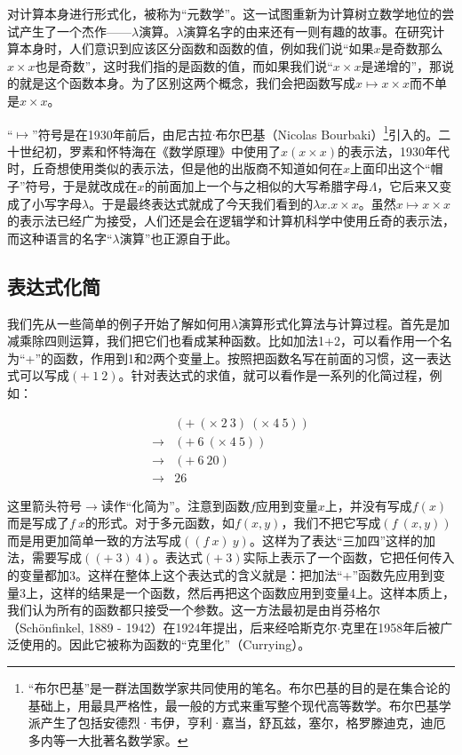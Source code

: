\documentclass{article}
\begin{document}
对计算本身进行形式化，被称为“元数学”。这一试图重新为计算树立数学地位的尝试产生了一个杰作——$\lambda$演算。$\lambda$演算名字的由来还有一则有趣的故事。在研究计算本身时，人们意识到应该区分函数和函数的值，例如我们说“如果$x$是奇数那么$x \times x$也是奇数”，这时我们指的是函数的值，而如果我们说“$x \times x$是递增的”，那说的就是这个函数本身。为了区别这两个概念，我们会把函数写成$x \mapsto x \times x$而不单是$x \times x$。

“$\mapsto$”符号是在1930年前后，由尼古拉$\cdot$布尔巴基（Nicolas Bourbaki）\footnote{“布尔巴基”是一群法国数学家共同使用的笔名。布尔巴基的目的是在集合论的基础上，用最具严格性，最一般的方式来重写整个现代高等数学。布尔巴基学派产生了包括安德烈·韦伊，亨利·嘉当，舒瓦兹，塞尔，格罗滕迪克，迪厄多内等一大批著名数学家。}引入的。二十世纪初，罗素和怀特海在《数学原理》中使用了$\hat{x}(x \times x)$的表示法，1930年代时，丘奇想使用类似的表示法，但是他的出版商不知道如何在$x$上面印出这个“帽子”符号，于是就改成在$x$的前面加上一个与之相似的大写希腊字母$\Lambda$，它后来又变成了小写字母$\lambda$。于是最终表达式就成了今天我们看到的$\lambda x . x \times x$\cite{Dowek2011}。虽然$x \mapsto x \times x$的表示法已经广为接受，人们还是会在逻辑学和计算机科学中使用丘奇的表示法，而这种语言的名字“$\lambda$演算”也正源自于此。

\subsection{表达式化简}
我们先从一些简单的例子开始了解如何用$\lambda$演算形式化算法与计算过程。首先是加减乘除四则运算，我们把它们也看成某种函数。比如加法1+2，可以看作用一个名为“+”的函数，作用到1和2两个变量上。按照把函数名写在前面的习惯，这一表达式可以写成$(+\ 1\ 2)$。针对表达式的求值，就可以看作是一系列的化简过程，例如：

\[
\begin{array}{ll}
    & (+\ (\times\ 2\ 3)\ (\times\ 4\ 5)) \\
\to & (+\ 6\ (\times\ 4\ 5)) \\
\to & (+\ 6\ 20) \\
\to & 26
\end{array}
\]

这里箭头符号$\to$读作“化简为”。注意到函数$f$应用到变量$x$上，并没有写成$f(x)$而是写成了$f\ x$的形式。对于多元函数，如$f(x, y)$，我们不把它写成$(f\ (x, y))$而是用更加简单一致的方法写成$((f\ x)\ y)$。这样为了表达“三加四”这样的加法，需要写成$((+\ 3)\ 4)$。表达式$(+\ 3)$实际上表示了一个函数，它把任何传入的变量都加3。这样在整体上这个表达式的含义就是：把加法“+”函数先应用到变量3上，这样的结果是一个函数，然后再把这个函数应用到变量4上。这样本质上，我们认为所有的函数都只接受一个参数。这一方法最初是由肖芬格尔（Schönfinkel, 1889 - 1942）在1924年提出，后来经哈斯克尔$\cdot$克里在1958年后被广泛使用的。因此它被称为函数的“克里化”（Currying）\cite{SPJ1987}。
\end{document}
